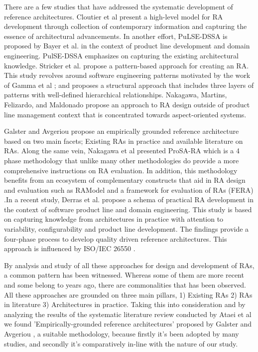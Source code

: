 \documentclass[review]{elsarticle}
\begin{document}
There are a few studies that have addressed the systematic development of reference architectures. Cloutier et al \cite{Cloutier} present a high-level model for RA development through collection of contemporary information and capturing the essence of architectural advancements. In another effort, PuLSE-DSSA is proposed by Bayer et al. \cite{bayer2004definition} in the context of product line development and domain engineering. PulSE-DSSA emphasizes on capturing the existing architectural knowledge. Stricker et al. \cite{stricker2010creating} propose a pattern-based approach for creating an RA. This study revolves around software engineering patterns motivated by the work of Gamma et al  \cite{gamma1995design}; and proposes a structural approach that includes three layers of patterns with well-defined hierarchical relationships. Nakagawa, Martins, Felizardo, and Maldonado \cite{nakagawa2009towards} propose an approach to RA design outside of product line management context that is concentrated towards aspect-oriented systems.

Galster and Avgeriou \cite{galster2011empirically} propose an empirically grounded reference architecture based on two main facets; Existing RAs in practice and available literature on RAs. Along the same vein, Nakagawa et al \cite{nakagawa2014consolidating} presented ProSA-RA which is a 4 phase methodology that unlike many other methodologies do provide a more comprehensive instructions on RA evaluation. In addition, this methodology benefits from an ecosystem of complementary constructs that aid in RA design and evaluation such as RAModel \cite{nakagawa2012ramodel} and a framework for evaluation of RAs (FERA) \cite{santos2013checklist}.In a recent study, Derras et al. \cite{derras2018reference} propose a schema of practical RA development in the context of software product line and domain engineering. This study is based on capturing knowledge from architectures in practice with attention to variability, configurability and product line development. The findings provide a four-phase process to develop quality driven reference architectures. This approach is influenced by ISO/IEC 26550 \cite{wg2015iso}.

By analysis and study of all these approaches for design and development of RAs, a common pattern has been witnessed. Whereas some of them are more recent and some belong to years ago, there are commonalities that has been observed. All these approaches are grounded on three main pillars, 1) Existing RAs 2) RAs in literature 3) Architectures in practice. Taking this into consideration and by analyzing the results of the systematic literature review conducted by Ataei et al \cite{AtaeiACIS} we found 'Empirically-grounded reference architectures' proposed by Galster and Avgeriou \cite{galster2011empirically}, a suitable methodology, because firstly it's been adopted by many studies, and secondly it's comparatively in-line with the nature of our study.
\end{document}
